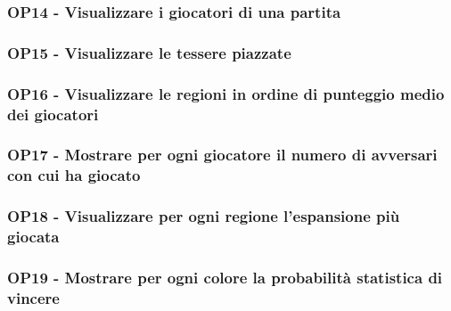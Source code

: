 \subsubsection*{OP14 - Visualizzare i giocatori di una partita}

\subsubsection*{OP15 - Visualizzare le tessere piazzate}

\subsubsection*{OP16 - Visualizzare le regioni in ordine di punteggio medio dei giocatori}

\subsubsection*{OP17 - Mostrare per ogni giocatore il numero di avversari con cui ha giocato}

\subsubsection*{OP18 - Visualizzare per ogni regione l'espansione più giocata}

\subsubsection*{OP19 - Mostrare per ogni colore la probabilità statistica di vincere}
